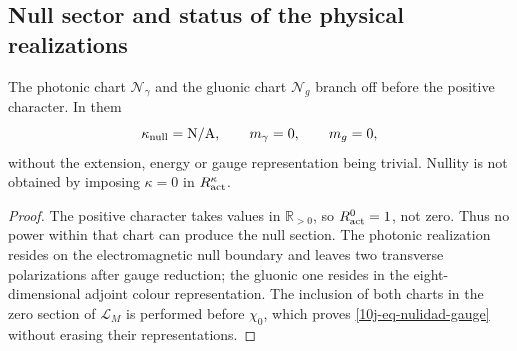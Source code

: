 \subsection{Null sector and status of the physical realizations}

\begin{theorem}
\label{10j-thm-sector-nulo}
The photonic chart \(\mathcal N_\gamma\) and the gluonic chart \(\mathcal N_g\) branch off before the positive character. In them
\begin{equation}
 \kappa_{\rm null}=\mathrm{N/A},
 \qquad m_\gamma=0,
 \qquad m_g=0,
 \label{10j-eq-nulidad-gauge}
\end{equation}
without the extension, energy or gauge representation being trivial. Nullity is not obtained by imposing \(\kappa=0\) in \(R_{\rm act}^\kappa\).
\end{theorem}

\begin{proof}
The positive character takes values in \(\mathbb R_{>0}\), so \(R_{\rm act}^0=1\), not zero. Thus no power within that chart can produce the null section. The photonic realization resides on the electromagnetic null boundary and leaves two transverse polarizations after gauge reduction; the gluonic one resides in the eight-dimensional adjoint colour representation. The inclusion of both charts in the zero section of \(\mathcal L_M\) is performed before \(\chi_0\), which proves \eqref{10j-eq-nulidad-gauge} without erasing their representations.
\end{proof}

